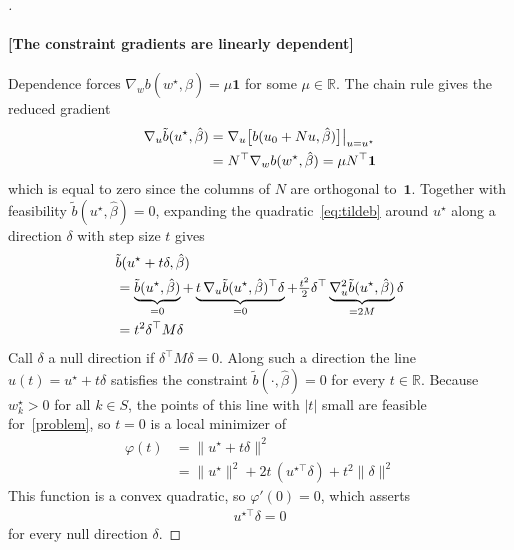 \documentclass[11pt]{article}
\begin{document}
\begin{proof}[]
\paragraph{[The constraint gradients are linearly dependent]} Dependence forces $\nabla_w b(w^\star, \hat\beta) = \mu \mathbf 1$ for some $\mu \in \mathbb R$. The chain rule gives the reduced gradient
\begin{align}
    \nabla_u \tilde b(u^\star, \hat\beta) &= \nabla_u\big[b(u_0 + Nu, \hat\beta)\big]\big|_{u = u^\star} \notag\\
    &= N^\top \nabla_w b(w^\star, \hat\beta) = \mu N^\top \mathbf 1\label{eq:redgradzero}
\end{align}
which is equal to zero since the columns of $N$ are orthogonal to~$\mathbf 1$.
Together with feasibility $\tilde b(u^\star,\hat\beta)=0$, expanding the quadratic~\eqref{eq:tildeb} around $u^\star$ along a direction $\delta$ with step size $t$ gives
\begin{align}
    &\tilde b(u^\star + t\delta, \hat\beta) \notag\\
    &= \underbrace{\tilde b(u^\star,\hat\beta)}_{=0} + \underbrace{t\,\nabla_u \tilde b(u^\star,\hat\beta)^\top \delta}_{=0} + \tfrac{t^2}{2}\delta^\top \underbrace{\nabla_u^2 \tilde b(u^\star,\hat\beta)}_{=2M}\delta \notag\\
    &= t^2 \delta^\top M \delta
\end{align}
Call $\delta$ a {null direction} if $\delta^\top M \delta = 0$. Along such a direction the line $u(t) = u^\star + t\delta$ satisfies the constraint $\tilde b(\cdot,\hat\beta)=0$ for every $t \in \mathbb R$. Because $w^\star_k > 0$ for all $k \in S$, the points of this line with $|t|$ small are feasible for~\eqref{problem}, so $t=0$ is a local minimizer of
\begin{align}
    \varphi(t) &= \|u^\star + t\delta\|^2 \\&= \|u^\star\|^2 + 2t\,(u^{\star\top}\delta) + t^2\|\delta\|^2
\end{align}
This function is a convex quadratic, so $\varphi'(0) = 0$, which asserts
\begin{align}
    u^{\star\top}\delta = 0 \label{eq:orthnull}
\end{align}
for every null direction $\delta$.


\end{proof}
\end{document}
